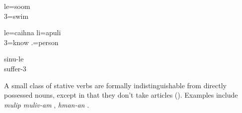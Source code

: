 \ea\label{ex:itr}
\gll le=soom\\
 3=swim\\
\glt {}
\z

\ea\label{ex:an}
\gll le=caihna li=apuli\\
  3=know .=person\\
\glt {}
\z


\ea\label{ex:stat}
\gll sinu-le\\
 suffer-3\\
\glt {}
\z



% 
% 
 

A small class of stative verbs are formally indistinguishable from directly possessed nouns, except in that they don't take articles (). Examples include \textit{mulip}  \textit{muliv-am} , \textit{hman-an} .

